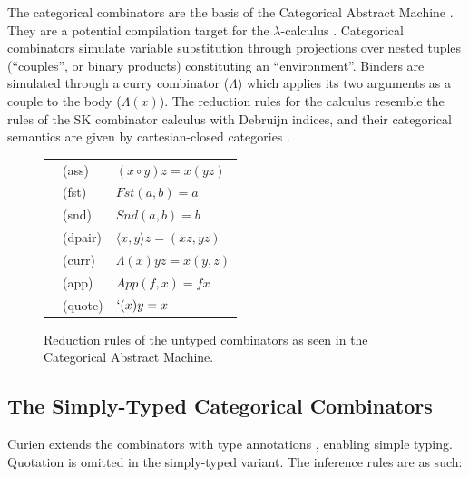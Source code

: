 \documentclass{article}
\begin{document}
The categorical combinators \autocite{CURIEN1986188} are the basis of the Categorical Abstract Machine \autocite{cmachine}. They are a potential compilation target for the \(\lambda\)-calculus \autocite{cmachine}. Categorical combinators simulate variable substitution through projections over nested tuples (``couples'', or binary products) constituting an ``environment''. Binders are simulated through a curry combinator (\(\Lambda\)) which applies its two arguments as a couple to the body (\(\Lambda(x)\)). The reduction rules for the calculus resemble the rules of the SK combinator calculus with Debruijn indices, and their categorical semantics are given by cartesian-closed categories \autocite[p. 178]{cmachine}.

\begin{figure}[H]
\begin{center}
\begin{tabular}{l l l}\label{red_untyped_cat}
&(ass) & \((x \circ y) z = x(y z)\) \\
&(fst) & \(Fst(a, b) = a\) \\
&(snd) & \(Snd(a, b) = b\) \\
&(dpair) & \(\langle x, y\rangle z = (x z, y z)\) \\
&(curr) & \(\Lambda(x)yz = x(y, z)\) \\
&(app) & \(App(f, x) = f x\) \\
&(quote) & \(`(x) y = x\)
\end{tabular}
\end{center}
\caption{Reduction rules of the untyped combinators as seen in the Categorical Abstract Machine.}
\end{figure}

\subsection{The Simply-Typed Categorical Combinators}

Curien extends the combinators with type annotations \autocite[p. 220]{CURIEN1986188}, enabling simple typing. Quotation is omitted in the simply-typed variant. The inference rules are as such:
\end{document}
